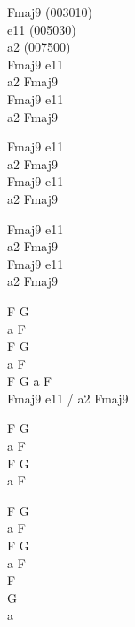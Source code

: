 \begin{chord}
\vin Fmaj9 (003010)\\
\vin e11 (005030)\\
\vin a2 (007500)\\
Fmaj9 e11\\
a2 Fmaj9\\
Fmaj9 e11\\
a2 Fmaj9

Fmaj9 e11\\
a2 Fmaj9\\
Fmaj9 e11\\
a2 Fmaj9

Fmaj9 e11\\
a2 Fmaj9\\
Fmaj9 e11\\
a2 Fmaj9

F G\\
a F\\
F G\\
a F\\
F G a F\\
Fmaj9 e11 / a2 Fmaj9

F G\\
a F\\
F G\\
a F

F G\\
a F\\
F G\\
a F\\
F\\
G\\
a
\end{chord}
